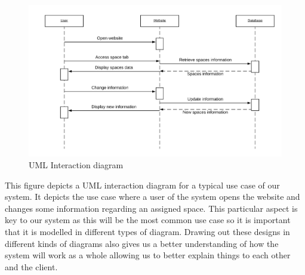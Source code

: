 \documentclass[11pt,a4paper]{article}
\begin{document}
\begin{figure}[!h]
    \centering
    \includegraphics[width=\linewidth]{interaction.png}
    \caption{UML Interaction diagram}
    \label{fig:basic_2}
\end{figure}

This figure depicts a UML interaction diagram for a typical use case of our system. It depicts the use case where a user of the system opens the website and changes some information regarding an assigned space. This particular aspect is key to our system as this will be the most common use case so it is important that it is modelled in different types of diagram. Drawing out these designs in different kinds of diagrams also gives us a better understanding of how the system will work as a whole allowing us to better explain things to each other and the client.
\end{document}
